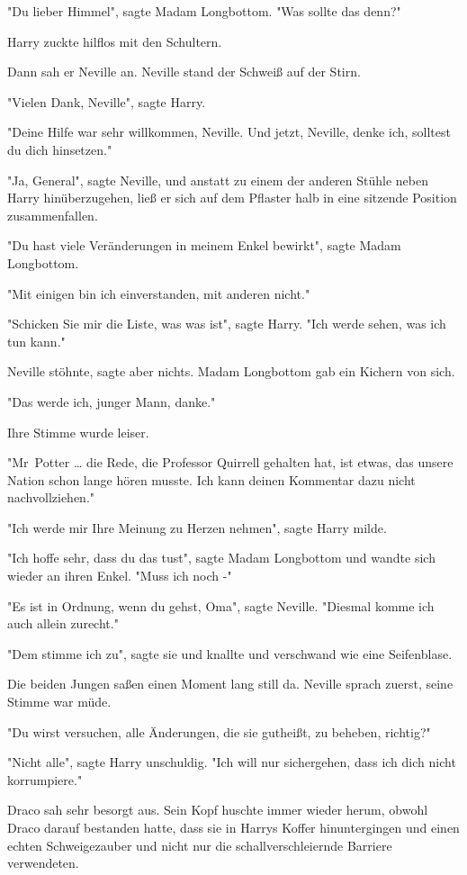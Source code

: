 {"Du lieber Himmel", sagte Madam Longbottom. "Was sollte das denn?"

Harry zuckte hilflos mit den Schultern.

Dann sah er Neville an. Neville stand der Schweiß auf der Stirn.

"Vielen Dank, Neville", sagte Harry.

"Deine Hilfe war sehr willkommen, Neville. Und jetzt, Neville, denke ich, solltest du dich hinsetzen."

"Ja, General", sagte Neville, und anstatt zu einem der anderen Stühle neben Harry hinüberzugehen, ließ er sich auf dem Pflaster halb in eine sitzende Position zusammenfallen.

"Du hast viele Veränderungen in meinem Enkel bewirkt", sagte Madam Longbottom.

"Mit einigen bin ich einverstanden, mit anderen nicht."

"Schicken Sie mir die Liste, was was ist", sagte Harry. "Ich werde sehen, was ich tun kann."

Neville stöhnte, sagte aber nichts. Madam Longbottom gab ein Kichern von sich.

"Das werde ich, junger Mann, danke."

Ihre Stimme wurde leiser.

"Mr~Potter … die Rede, die Professor Quirrell gehalten hat, ist etwas, das unsere Nation schon lange hören musste. Ich kann deinen Kommentar dazu nicht nachvollziehen."

"Ich werde mir Ihre Meinung zu Herzen nehmen", sagte Harry milde.

"Ich hoffe sehr, dass du das tust", sagte Madam Longbottom und wandte sich wieder an ihren Enkel. "Muss ich noch -"

"Es ist in Ordnung, wenn du gehst, Oma", sagte Neville. "Diesmal komme ich auch allein zurecht."

"Dem stimme ich zu", sagte sie und knallte und verschwand wie eine Seifenblase.

Die beiden Jungen saßen einen Moment lang still da. Neville sprach zuerst, seine Stimme war müde.

"Du wirst versuchen, alle Änderungen, die sie gutheißt, zu beheben, richtig?"

"Nicht alle", sagte Harry unschuldig. "Ich will nur sichergehen, dass ich dich nicht korrumpiere."

Draco sah sehr besorgt aus. Sein Kopf huschte immer wieder herum, obwohl Draco darauf bestanden hatte, dass sie in Harrys Koffer hinuntergingen und einen echten Schweigezauber und nicht nur die schallverschleiernde Barriere verwendeten.

}
